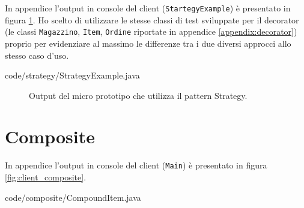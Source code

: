 \documentclass[12pt]{article}
\begin{document}
In appendice l'output in console del client ({\tt StartegyExample}) è presentato in figura \ref{fig:client_strategy}. Ho scelto di utilizzare le stesse classi di test sviluppate per il decorator (le classi {\tt Magazzino}, {\tt Item}, {\tt Ordine} riportate in appendice \ref{appendix:decorator}) proprio per evidenziare al massimo le differenze tra i due diversi approcci allo stesso caso d'uso.


{code/strategy/StrategyExample.java}

\begin{figure}[!h]
  \caption{\small Output del micro prototipo che utilizza il pattern Strategy.}
  \label{fig:client_strategy}
\end{figure}


\newpage
\section{Composite}
\label{appendix:composite}

In appendice l'output in console del client ({\tt Main}) è presentato in figura \ref{fig:client_composite}.


{code/composite/CompoundItem.java}
\end{document}
